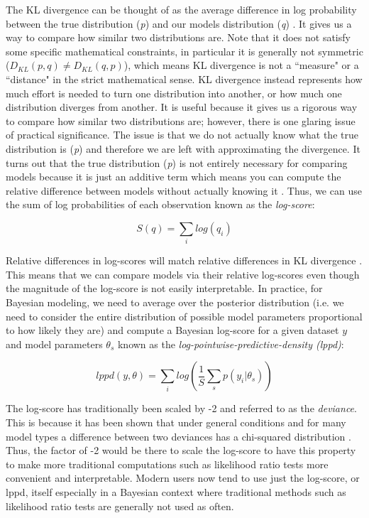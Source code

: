 The KL divergence can be thought of as the average difference in log probability between the true distribution (\textit{p}) and our models distribution (\textit{q}) \cite{McElreath2020}. It gives us a way to compare how similar two distributions are. Note that it does not satisfy some specific mathematical constraints, in particular it is generally not symmetric ($D_{KL}(p,q) \neq D_{KL}(q,p)$), which means KL divergence is not a ``measure" or a ``distance" in the strict mathematical sense. KL divergence instead represents how much effort is needed to turn one distribution into another, or how much one distribution diverges from another. It is useful because it gives us a rigorous way to compare how similar two distributions are; however, there is one glaring issue of practical significance. The issue is that we do not actually know what the true distribution is (\textit{p}) and therefore we are left with approximating the divergence. It turns out that the true distribution (\textit{p}) is not entirely necessary for comparing models because it is just an additive term which means you can compute the relative difference between models without actually knowing it \cite{McElreath2020}. Thus, we can use the sum of log probabilities of each observation known as the \textit{log-score}:

\begin{equation} \label{eq:log-score}
S(q) = \sum_i log(q_i)
\end{equation}

Relative differences in log-scores will match relative differences in KL divergence \cite{McElreath2020}. This means that we can compare models via their relative log-scores even though the magnitude of the log-score is not easily interpretable. In practice, for Bayesian modeling, we need to average over the posterior distribution (i.e. we need to consider the entire distribution of possible model parameters proportional to how likely they are) and compute a Bayesian log-score for a given dataset $y$ and model parameters $\theta_s$ known as the \textit{log-pointwise-predictive-density (lppd)}:

\begin{equation} \label{eq:lppd}
lppd(y, \theta) = \sum_i log \left( \frac{1}{S} \sum_s p(y_i | \theta_s) \right)
\end{equation}

The log-score has traditionally been scaled by -2 and referred to as the \textit{deviance}. This is because it has been shown that under general conditions and for many model types a difference between two deviances has a chi-squared distribution \cite{Dunn2018}. Thus, the factor of -2 would be there to scale the log-score to have this property to make more traditional computations such as likelihood ratio tests more convenient and interpretable. Modern users now tend to use just the log-score, or lppd, itself especially in a Bayesian context where traditional methods such as likelihood ratio tests are generally not used as often.

